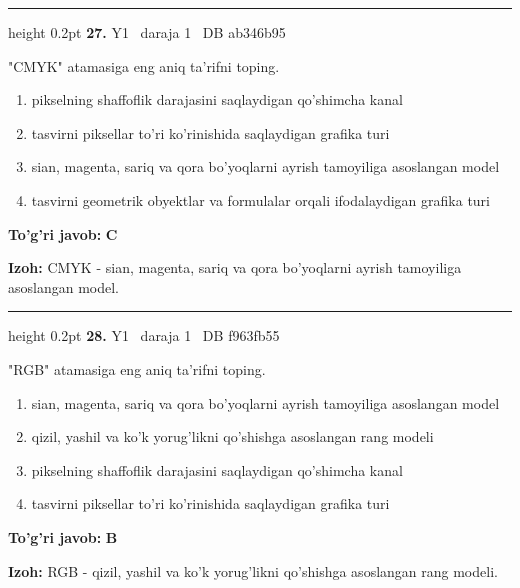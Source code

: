 \documentclass[10pt,a4paper,oneside]{article}
\begin{document}
\vspace{2mm}\hrule height 0.2pt \vspace{4mm}
\hypertarget{q27}{\textbf{\color{ink}27.}}  {\color{muted}\scriptsize Y1 \textbullet\ daraja 1 \textbullet\ DB ab346b95}
\par
"CMYK" atamasiga eng aniq ta'rifni toping.
\begin{enumerate}[label=\Alph*),leftmargin=9mm]
\item pikselning shaffoflik darajasini saqlaydigan qo'shimcha kanal
\item tasvirni piksellar to'ri ko'rinishida saqlaydigan grafika turi
\item sian, magenta, sariq va qora bo'yoqlarni ayrish tamoyiliga asoslangan model
\item tasvirni geometrik obyektlar va formulalar orqali ifodalaydigan grafika turi
\end{enumerate}
\begin{tcolorbox}[enhanced,breakable,colback=teal!4,colframe=teal!45!black,boxrule=0.45pt,arc=1.2mm,left=2.8mm,right=2.8mm,top=2mm,bottom=2mm,before skip=2mm,after skip=2mm]
\textbf{\color{teal}To'g'ri javob:} \textbf{C}
\par\smallskip
\textbf{Izoh:} CMYK - sian, magenta, sariq va qora bo'yoqlarni ayrish tamoyiliga asoslangan model.
\end{tcolorbox}
\vspace{2mm}\hrule height 0.2pt \vspace{4mm}
\hypertarget{q28}{\textbf{\color{ink}28.}}  {\color{muted}\scriptsize Y1 \textbullet\ daraja 1 \textbullet\ DB f963fb55}
\par
"RGB" atamasiga eng aniq ta'rifni toping.
\begin{enumerate}[label=\Alph*),leftmargin=9mm]
\item sian, magenta, sariq va qora bo'yoqlarni ayrish tamoyiliga asoslangan model
\item qizil, yashil va ko'k yorug'likni qo'shishga asoslangan rang modeli
\item pikselning shaffoflik darajasini saqlaydigan qo'shimcha kanal
\item tasvirni piksellar to'ri ko'rinishida saqlaydigan grafika turi
\end{enumerate}
\begin{tcolorbox}[enhanced,breakable,colback=teal!4,colframe=teal!45!black,boxrule=0.45pt,arc=1.2mm,left=2.8mm,right=2.8mm,top=2mm,bottom=2mm,before skip=2mm,after skip=2mm]
\textbf{\color{teal}To'g'ri javob:} \textbf{B}
\par\smallskip
\textbf{Izoh:} RGB - qizil, yashil va ko'k yorug'likni qo'shishga asoslangan rang modeli.
\end{tcolorbox}
\end{document}
